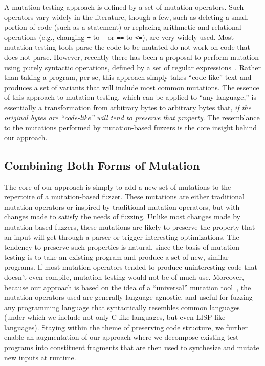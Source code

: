 A mutation testing approach is defined by a set of mutation operators.  Such operators vary widely in the literature, though a few, such as deleting a small portion of code (such as a statement) or replacing arithmetic and relational operations (e.g., changing {\tt +} to {\tt -} or {\tt ==} to {\tt <=}), are very widely used.  Most mutation testing tools parse the code to be mutated do not work on code that does not parse.  However, recently there has been a proposal to perform mutation using purely syntactic operations, defined by a set of regular expressions~\cite{regexpMut}.  Rather than taking a program, per se, this approach simply takes ``code-like'' text and produces a set of variants that will include most common mutations.  The essence of this approach to mutation testing, which can be applied to ``any language,'' is essentially a transformation from arbitrary bytes to arbitrary bytes that, \emph{if the original bytes are ``code-like'' will tend to preserve that property}.  The resemblance to the mutations performed by mutation-based fuzzers is the core insight behind our approach.

\subsection{Combining Both Forms of Mutation}

The core of our approach is simply to add a new set of mutations to the repertoire of a mutation-based fuzzer.  These mutations are either traditional mutation operators or inspired by traditional mutation operators, but with changes made to satisfy the needs of fuzzing.  Unlike most changes made by mutation-based fuzzers, these mutations are likely to preserve the property that an input will get through a parser or trigger interesting optimizations.  The tendency to preserve such properties is natural, since the basis of mutation testing is to take an existing program and produce a set of new, similar programs.  If most mutation operators tended to produce uninteresting code that doesn't even compile, mutation testing would not be of much use.  Moreover, because our approach is based on the idea of a ``universal'' mutation tool~\cite{regexpMut}, the mutation operators used are generally language-agnostic, and useful for fuzzing any programming language that syntactically resembles common languages (under which we include not only C-like languages, but even LISP-like languages). Staying within the theme of preserving code structure, we further enable an augmentation of our approach where we decompose existing test programs into constituent fragments that are then used to synthesize and mutate new inputs at runtime.

